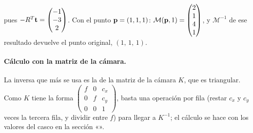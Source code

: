 pues $-R^{T}\mathbf{t}=\begin{pmatrix} -1 \\ -3 \\ 2 \end{pmatrix}$. Con el punto $\mathbf{p}=(1,1,1)$: $\mathcal{M}(\mathbf{p},1)=\begin{pmatrix} 2 \\ 1 \\ 4 \\ 1 \end{pmatrix}$, y $\mathcal{M}^{-1}$ de ese resultado devuelve el punto original, $(1,\,1,\,1)$.

\paragraph{Cálculo con la matriz de la cámara.} La inversa que más se usa es la de la matriz de la cámara
$K$, que es triangular. Como $K$ tiene la forma $\left(\begin{smallmatrix}f&0&c_x\\0&f&c_y\\0&0&1\end{smallmatrix}\right)$,
basta una operación por fila (restar $c_x$ y $c_y$ veces la tercera fila, y dividir entre $f$) para
llegar a $K^{-1}$; el cálculo se hace con los valores del casco en la sección «».

